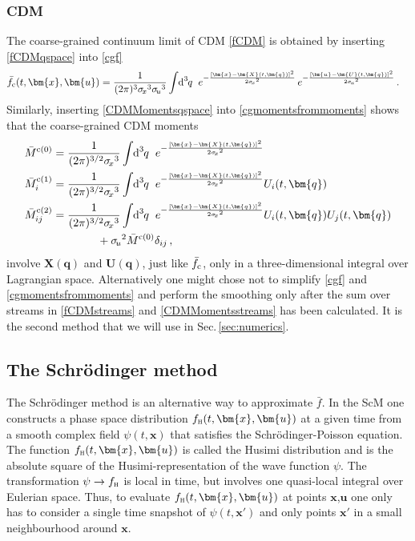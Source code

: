 \documentclass[twocolumn, nofootinbib, showpacs, superscriptaddress]{revtex4-1}
\renewcommand{\H}[0]{{\textsc{h}}}
\newcommand{\sigu}{{\sigma_{\! u}}}
\newcommand{\sigx}{{\sigma_{\! x}}}
\newcommand{\vol}[2]{\hspace{-0.8mm}\mbox{$\text{d}^{\hspace{-0.0mm}#1}$}\hspace{-0.2mm}#2\hspace{0.8mm}\ }
\newcommand{\vx}[0]{\bm{x} }
\newcommand{\vX}[0]{\bm{X} }
\newcommand{\vq}[0]{\bm{q} }
\newcommand{\vu}[0]{\bm{u} }
\newcommand{\vU}[0]{\bm{U} }
\begin{document}
\subsubsection{CDM}
The coarse-grained continuum limit of CDM \eqref{fCDM} is obtained by inserting \eqref{fCDMqspace} into \eqref{cgf}  
\begin{align} \label{fcgCDM}
\bar f_{\rm c} (t,\vx,\vu)
&= \frac{1}{ (2\pi)^3 \sigx^3 \sigu^3}\int \vol{3}{q} e^{-\frac{\left[\vx - \vX(t,\vq)\right]^2}{2 \sigx^2}}
 \, e^{-\frac{\left[\vu - \vU(t,\vq)\right]^2}{2 \sigu^2}} \,.
\end{align}
Similarly, inserting \eqref{CDMMomentsqspace} into \eqref{cgmomentsfrommoments} shows that the coarse-grained CDM moments
\begin{subequations}\label{cgCDMmoments}
\begin{align}
\bar M^{\mathrm{c}(0)}& = \frac{1}{ (2\pi)^{3/2} \sigx^3}  \int \vol{3}{q}  e^{-\frac{ \left[\vx - \vX(t,\vq)\right]^2}{2 \sigx^2}}   
\\
\bar M^{\mathrm{c}(1)}_i &=  \frac{1}{ (2\pi)^{3/2} \sigx^3}  \int \vol{3}{q}  e^{-\frac{\left[\vx - \vX(t,\vq)\right]^2}{2 \sigx^2}} U_i(t,\vq)  
\\
\bar M^{\mathrm{c}(2)}_{ij}& = \frac{1}{ (2\pi)^{3/2} \sigx^3}  \int \vol{3}{q}  e^{-\frac{\left[\vx - \vX(t,\vq)\right]^2}{2 \sigx^2}} U_i(t,\vq) U_j(t,\vq) 
\notag 
\label{cgCDM2ndmoment}
\\
& \qquad \qquad + \sigu^2 \bar M^{\mathrm{c}(0)} \delta_{ij}  \,,
\end{align}
\end{subequations}
 involve $\vX(\vq)$ and $\vU(\vq)$, just like $\bar f_{\rm c}$, 
 only in a three-dimensional integral over Lagrangian space. Alternatively one might chose not to simplify \eqref{cgf} and \eqref{cgmomentsfrommoments} and perform the smoothing only after  the sum over streams in \eqref{fCDMstreams} and \eqref{CDMMomentsstreams} has been calculated. 
It is the second method that we will use in Sec.\,\ref{sec:numerics}.

\subsection{The Schr\"odinger method} 
\label{sec:ScMtoVlasov}
The Schr\"odinger method is an alternative way to approximate $\bar f$.
In the ScM  one constructs a phase space distribution $f_\H(t,\vx,\vu)$ at a given time from a smooth complex field $\psi(t,\vx)$ 
that satisfies the Schr\"odinger-Poisson equation. The function $f_\H(t,\vx,\vu)$ is called the Husimi distribution and is the absolute square of 
the Husimi-representation of the wave function $\psi$. 
The transformation $\psi \rightarrow f_\H$ is local in time, but involves one quasi-local integral over Eulerian space.
 Thus, to evaluate $f_\H(t,\vx,\vu)$ at points $\vx$,$\vu$ one only has to consider a single time snapshot of $\psi(t,\vx')$ and only points $\vx'$ in a small neighbourhood around $\vx$.
\end{document}
